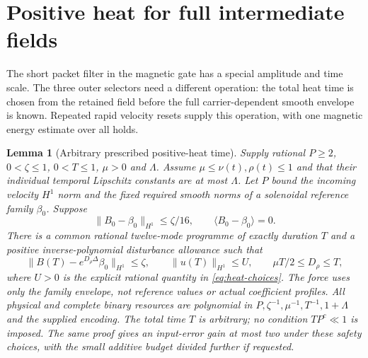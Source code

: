\documentclass[11pt,a4paper]{amsart}
\newtheorem{lemma}[theorem]{Lemma}
\theoremstyle{definition}
\theoremstyle{remark}
\numberwithin{equation}{section}
\newcommand{\norm}[1]{\lVert #1\rVert}
\newcommand{\mean}[1]{\langle #1\rangle}
\begin{document}
\section{Positive heat for full intermediate fields}\label{sec:heat}
The short packet filter in the magnetic gate has a special amplitude and
time scale.  The three outer selectors need a different operation: the
total heat time is chosen from the retained field before the full
carrier-dependent smooth envelope is known.  Repeated rapid velocity
resets supply this operation, with one magnetic energy estimate over
all holds.

\begin{lemma}[Arbitrary prescribed positive-heat time]\label{lem:heat}
Supply rational $P\ge2$, $0<\zeta\le1$, $0<T\le1$, $\mu>0$ and
$\Lambda$. Assume $\mu\le\nu(t),\rho(t)\le1$ and that their individual
temporal Lipschitz constants are at most $\Lambda$.
Let $P$ bound the incoming velocity $H^1$ norm and the fixed
required smooth norms of a solenoidal reference family $\beta_0$.
Suppose
\begin{equation}\label{eq:heat-input}
 \norm{B_0-\beta_0}_{H^1}\le\zeta/16,
 \qquad\mean{B_0-\beta_0}=0.
\end{equation}
There is a common rational twelve-mode programme of exactly duration $T$
and a positive inverse-polynomial disturbance allowance such that
\begin{equation}\label{eq:heat-output}
 \norm{B(T)-e^{D_\rho\Delta}\beta_0}_{H^1}\le\zeta,
 \qquad\norm{u(T)}_{H^1}\le U,
 \qquad\mu T/2\le D_\rho\le T,
\end{equation}
where $U>0$ is the explicit rational quantity in
\eqref{eq:heat-choices}.  The force uses only the family envelope, not
reference values or actual coefficient profiles.  All physical and
complete binary resources are polynomial in
$P,\zeta^{-1},\mu^{-1},T^{-1},1+\Lambda$ and the supplied encoding.
The total time $T$ is arbitrary; no condition $TP^c\ll1$ is imposed.
The same proof gives an input-error gain at most two under these safety
choices, with the small additive budget divided further if requested.
\end{lemma}
\end{document}
